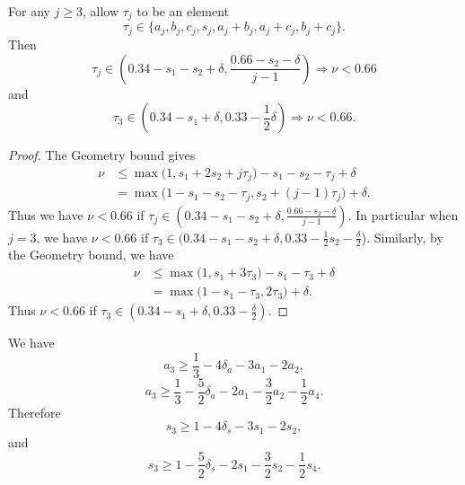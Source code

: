 \begin{lemma}\label{lem:SubSumGeometry}
  \leanok

  For any $j\ge3$, allow $\tau_j$ to be an element
  \begin{equation}\label{eq:taujdef}
  \tau_j\in\{a_j,b_j,c_j, s_j, a_j+b_j,a_j+c_j,b_j+c_j\}.
  \end{equation}
  Then
  \begin{equation}\label{eq:Geotauj}
    \tau_j\in
    \left(0.34-s_1-s_2+\delta,
    \frac{0.66 -s_2-\delta}{j-1}\right)
    \Longrightarrow
    \nu < 0.66
  \end{equation}
  and
  \begin{equation}\label{eq:Geotau3}
    \tau_3\in
    \left(0.34-s_1+\delta, 0.33-\frac{1}{2}\delta\right)
    \Longrightarrow
    \nu < 0.66.
  \end{equation}
\end{lemma}
\begin{proof}
  \leanok
  The Geometry bound gives
  \begin{align*}
  \nu & \le \max\big(1, s_1+2s_2+j\tau_j\big)-s_1-s_2-\tau_j +\delta\\
  & = \max\big(1-s_1-s_2-\tau_j, s_2+(j-1)\tau_j \big)+\delta.
  \end{align*}
  Thus we have $\nu< 0.66$ if
  $\tau_j\in (0.34-s_1-s_2+\delta, \frac{0.66-s_2-\delta}{j-1})$.
  In particular when $j=3$, we have $\nu< 0.66$ if
  $\tau_3\in (0.34-s_1-s_2+\delta, 0.33-\frac{1}{2}s_2-\frac{\delta}{2}$).
  Similarly, by the Geometry bound, we have
  \begin{align*}
  \nu & \le \max\big(1, s_1+3\tau_3\big)-s_1-\tau_3+\delta\\
  &= \max\big(1-s_1-\tau_3, 2\tau_3\big)+\delta.
  \end{align*}
  Thus $\nu< 0.66$ if $\tau_3\in (0.34-s_1+\delta, 0.33-\frac{\delta}{2})$.
\end{proof}

\begin{lemma}\label{lem:ThreeLowerBounds}
  \leanok
  We have
  \begin{equation}\label{eq:black1}
    a_3 \ge \frac{1}{3}-4\delta_a - 3a_1 - 2a_2,
  \end{equation}
  \begin{equation*}
    a_3 \ge \frac{1}{3}-\frac{5}{2}\delta_a - 2a_1 - \frac{3}{2}a_2 - \frac{1}{2}a_4.
  \end{equation*}
  Therefore
  \begin{equation}
  s_3 \ge 1-4\delta_s - 3s_1 - 2s_2, \label{eq:s3>s12}
  \end{equation}
  and
  \begin{equation}
  s_3 \ge 1-\frac{5}{2}\delta_s - 2s_1 - \frac{3}{2}s_2 - \frac{1}{2}s_4. \label{eq:s3>s124}
  \end{equation}
\end{lemma}

